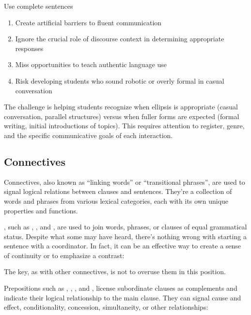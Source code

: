 \begin{tblsframed}{Use complete sentences}
\begin{enumerate}[noitemsep, leftmargin=*]
   \item Create artificial barriers to fluent communication
   \item Ignore the crucial role of discourse context in determining appropriate responses
   \item Miss opportunities to teach authentic language use
   \item Risk developing students who sound robotic or overly formal in casual conversation
\end{enumerate}

\indent The challenge is helping students recognize when ellipsis is appropriate (casual conversation, parallel structures) versus when fuller forms are expected (formal writing, initial introductions of topics). This requires attention to register, genre, and the specific communicative goals of each interaction.
\end{tblsframed}


\subsection{Connectives}

Connectives, also known as \enquote{linking words} or \enquote{transitional phrases}, are used to signal logical relations between clauses and sentences. They're a collection of words and phrases from various lexical categories, each with its own unique properties and functions.

, such as , , and , are used to join words, phrases, or clauses of equal grammatical status. Despite what some may have heard, there's nothing wrong with starting a sentence with a coordinator. In fact, it can be an effective way to create a sense of continuity or to emphasize a contrast:

\z
The key, as with other connectives, is not to overuse them in this position.

Prepositions such as , , , and , license subordinate clauses as complements and indicate their logical relationship to the main clause. They can signal cause and effect, conditionality, concession, simultaneity, or other relationships:

